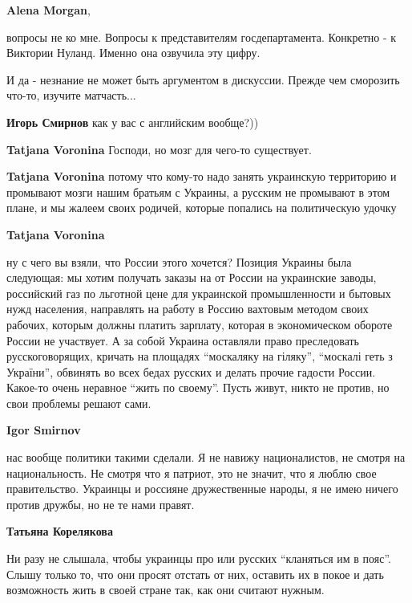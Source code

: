 \begin{itemize}
\begin{itemize}
\textbf{Alena Morgan}, 

вопросы не ко мне. Вопросы к представителям госдепартамента. Конкретно - к
Виктории Нуланд. Именно она озвучила эту цифру.

И да - незнание не может быть аргументом в дискуссии. Прежде чем сморозить что-то, изучите матчасть...

\textbf{Игорь Смирнов} как у вас с английским вообще?))

\textbf{Tatjana Voronina} Господи, но мозг для чего-то существует.

\textbf{Tatjana Voronina} потому что кому-то надо занять украинскую территорию и промывают мозги нашим братьям с Украины, а русским не промывают в этом плане, и мы жалеем своих родичей, которые попались на политическую удочку


\textbf{Tatjana Voronina} 

ну с чего вы взяли, что России этого хочется? Позиция Украины была следующая:
мы хотим получать заказы на от России на украинские заводы, российский газ по
льготной цене для украинской промышленности и бытовых нужд населения,
направлять на работу в Россию вахтовым методом своих рабочих, которым должны
платить зарплату, которая в экономическом обороте России не участвует. А за
собой Украина оставляли право преследовать русскоговорящих, кричать на площадях
\enquote{москаляку на гіляку}, \enquote{москалі геть з України}, обвинять во всех бедах
русских и делать прочие гадости России. Какое-то очень неравное \enquote{жить по
своему}. Пусть живут, никто не против, но свои проблемы решают сами.


\textbf{Igor Smirnov} 

нас вообще политики такими сделали. Я не навижу националистов, не смотря на
национальность. Не смотря что я патриот, это не значит, что я люблю свое
правительство. Украинцы и россияне дружественные народы, я не имею ничего
против дружбы, но не те нами правят.

\textbf{Татьяна Корелякова} 

Ни разу не слышала, чтобы украинцы про или русских \enquote{кланяться им в пояс}. Слышу
только то, что они просят отстать от них, оставить их в покое и дать
возможность жить в своей стране так, как они считают нужным.


\end{itemize}
\end{itemize}
